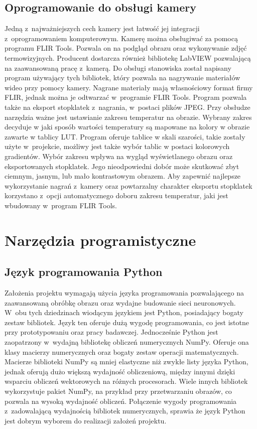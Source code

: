 \subsection{Oprogramowanie do obsługi kamery} \label{subsec:camsoft}
Jedną z~najważniejszych cech kamery jest łatwość jej integracji
z~oprogramowaniem komputerowym.
Kamerę można obsługiwać za pomocą programu FLIR Tools.
Pozwala on na podgląd obrazu oraz wykonywanie zdjęć termowizyjnych.
Producent dostarcza również bibliotekę LabVIEW pozwalającą na zaawansowaną
pracę z~kamerą.
Do obsługi stanowiska został napisany program używający tych bibliotek,
który pozwala na nagrywanie materiałów wideo przy pomocy kamery.
Nagrane materiały mają własnościowy format firmy FLIR, jednak można je
odtwarzać w~programie FLIR Tools.
Program pozwala także na eksport stopklatek z~nagrania, w~postaci plików JPEG.
Przy obsłudze narzędzia ważne jest ustawianie zakresu temperatur na obrazie.
Wybrany zakres decyduje w jaki sposób wartości temperatury są mapowane na
kolory w obrazie zawarte w tablicy LUT.
Program oferuje tablice w skali szarości, takie zostały użyte w~projekcie,
możliwy jest także wybór tablic w postaci kolorowych gradientów.
Wybór zakresu wpływa na wygląd wyświetlanego obrazu oraz eksportowanych
stopklatek.
Jego nieodpowiedni dobór może skutkować zbyt ciemnym, jasnym, lub mało
kontrastowym obrazem.
Aby zapewnić najlepsze wykorzystanie nagrań z~kamery oraz powtarzalny
charakter eksportu stopklatek korzystano z~opcji automatycznego doboru
zakresu temperatur, jaki jest wbudowany w~program FLIR Tools.

\section{Narzędzia programistyczne}

\subsection{Język programowania Python}
Założenia projektu wymagają użycia języka programowania pozwalającego
na zaawansowaną obróbkę obrazu oraz wydajne budowanie sieci neuronowych.
W~obu tych dziedzinach wiodącym językiem jest Python, posiadający bogaty
zestaw bibliotek.
Język ten oferuje dużą wygodę programowania, co jest istotne przy
prototypowaniu oraz pracy badawczej.
Jednocześnie Python jest zaopatrzony w~wydajną bibliotekę obliczeń
numerycznych NumPy.
Oferuje ona klasy macierzy numerycznych oraz bogaty zestaw operacji
matematycznych.
Macierze biblioteki NumPy są mniej elastyczne niż zwykłe listy języka Python,
jednak oferują dużo większą wydajność obliczeniową, między innymi dzięki
wsparciu obliczeń wektorowych na różnych procesorach.
Wiele innych bibliotek wykorzystuje pakiet NumPy, na przykład przy
przetwarzaniu obrazów, co pozwala na wysoką wydajność obliczeń.
Połączenie wygody programowania z~zadowalającą wydajnością bibliotek
numerycznych, sprawia że język Python jest dobrym wyborem do realizacji
założeń projektu.

